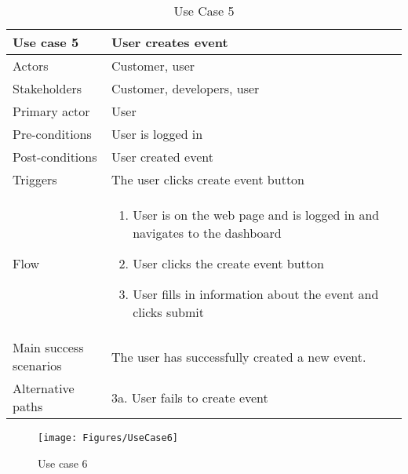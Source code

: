 \begin{table}[H]
\begin{tabular}{ | L{0.25\linewidth} | L{0.75\linewidth} | } 
 \hline {}
 Use case 5 & User creates event  \\ 
 \hline
 Actors & Customer, user \\ 
 \hline
 Stakeholders & Customer, developers, user \\ 
  \hline
 Primary actor & User  \\ 
 \hline
 Pre-conditions & User is logged in \\ 
 \hline
 Post-conditions & User created event \\ 
  \hline
 Triggers & The user clicks create event button  \\ 
 \hline
Flow & \begin{minipage}{5in}
    \vskip 1pt
    \begin{enumerate}
  \item User is on the web page and is logged in and navigates to the dashboard
  \item User clicks the create event button 
  \item User fills in information about the event and clicks submit
   \end{enumerate}
   \vskip 4pt
 \end{minipage}\\ 
 \hline
 Main success scenarios & The user has successfully created a new event. \\ 
 \hline
 Alternative paths & 3a. User fails to create event\\
 \hline
\end{tabular}
\caption{Use Case 5}
\end{table}

\begin{figure}[H]
\centering
\texttt{[image: Figures/UseCase6]}
\caption{Use case 6}
    \label{fig:UC6}
    \end{figure}

